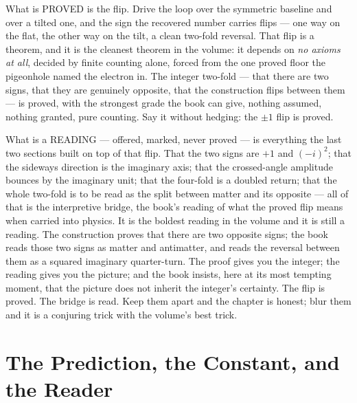 What is PROVED is the flip. Drive the loop over the symmetric baseline and over a tilted one, and the sign the
recovered number carries flips --- one way on the flat, the other way on the tilt, a clean two-fold reversal. That
flip is a theorem, and it is the cleanest theorem in the volume: it depends on \emph{no axioms at all}, decided by
finite counting alone, forced from the one proved floor the pigeonhole named the electron in. The integer
two-fold --- that there are two signs, that they are genuinely opposite, that the construction flips between them
--- is proved, with the strongest grade the book can give, nothing assumed, nothing granted, pure counting. Say it
without hedging: the $\pm 1$ flip is proved.

What is a READING --- offered, marked, never proved --- is everything the last two sections built on top of that
flip. That the two signs are $+1$ and $(-i)^2$; that the sideways direction is the imaginary axis; that the
crossed-angle amplitude bounces by the imaginary unit; that the four-fold is a doubled return; that the whole
two-fold is to be read as the split between matter and its opposite --- all of that is the interpretive bridge,
the book's reading of what the proved flip means when carried into physics. It is the boldest reading in the
volume and it is still a reading. The construction proves that there are two opposite signs; the book reads those
two signs as matter and antimatter, and reads the reversal between them as a squared imaginary quarter-turn. The
proof gives you the integer; the reading gives you the picture; and the book insists, here at its most tempting
moment, that the picture does not inherit the integer's certainty. The flip is proved. The bridge is read. Keep
them apart and the chapter is honest; blur them and it is a conjuring trick with the volume's best trick.

\section{The Prediction, the Constant, and the Reader}

